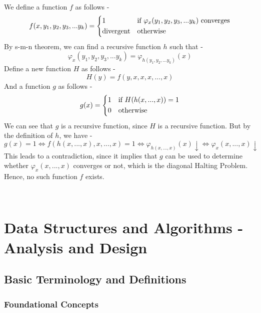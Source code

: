 \documentclass[openany]{book}
\begin{document}
\begin{exercise} \\
    We define a function $f$ as follows -
    $$f(x, y_1, y_2, y_3, ... y_k) = \begin{dcases}
        1 & \text{if } \varphi_x(y_1, y_2, y_3, ... y_k) \text{ converges} \\
        \text{divergent} & \text{otherwise}
    \end{dcases}$$
    By s-m-n theorem, we can find a recursive function $h$ such that -
    $$\varphi_x(y_1, y_2, y_3, ... y_k) = \varphi_{h(y_1, y_2, ... y_k)}(x)$$
    Define a new function $H$ as follows -
    $$H(y) = f(y, x, x, x, ..., x)$$
    And a function $g$ as follows - 
    $$g(x) = \begin{dcases}
        1 & \text{if } H(h(x, ..., x)) = 1 \\
        0 & \text{otherwise}
        \end{dcases}$$
    We can see that $g$ is a recursive function, since $H$ is a recursive function. But by the definition of $h$, we have - 
    $$g(x) = 1 \iff f(h(x, ..., x), x, ..., x) = 1 \iff \varphi_{h(x, ..., x)}(x)\downarrow \iff \varphi_{x}(x, ..., x) \downarrow$$ 
    This leads to a contradiction, since it implies that $g$ can be used to determine whether $\varphi_x(x, ..., x)$ converges or not, which is the diagonal Halting Problem. Hence, no such function $f$ exists.
\end{exercise}
\begin{exercise} \\
    
\end{exercise}











\part{Data Structures and Algorithms - Analysis and Design}
\chapter{Basic Terminology and Definitions}
\section{Foundational Concepts}
\end{document}
